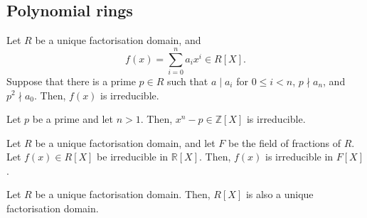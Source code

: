 \documentclass[11pt]{article}
\newcommand{\R}{\mathbb{R}}
\newcommand{\Z}{\mathbb{Z}}
\theoremstyle{definition}
\theoremstyle{remark}
\numberwithin{equation}{section}
\begin{document}
    \subsection{Polynomial rings}
    
    \begin{theorem}
        Let $R$ be a unique factorisation domain, and \[
            f(x) = \sum_{i = 0}^n a_ix^i \in R[X].
        \] Suppose that there is a prime $p \in R$ such that $a\mid a_i$ for $0 \leq
        i < n$, $p\nmid a_n$, and $p^2 \nmid a_0$. Then, $f(x)$ is irreducible.
    \end{theorem}
    \begin{corollary}
        Let $p$ be a prime and let $n > 1$. Then, $x^n - p \in \Z[X]$ is irreducible.
    \end{corollary}

    \begin{lemma}
        Let $R$ be a unique factorisation domain, and let $F$ be the field of
        fractions of $R$. Let $f(x) \in R[X]$ be irreducible in $\R[X]$. Then, $f(x)$
        is irreducible in $F[X]$.
    \end{lemma}

    \begin{theorem}
        Let $R$ be a unique factorisation domain. Then, $R[X]$ is also a unique
        factorisation domain.
    \end{theorem}
    
\end{document}
